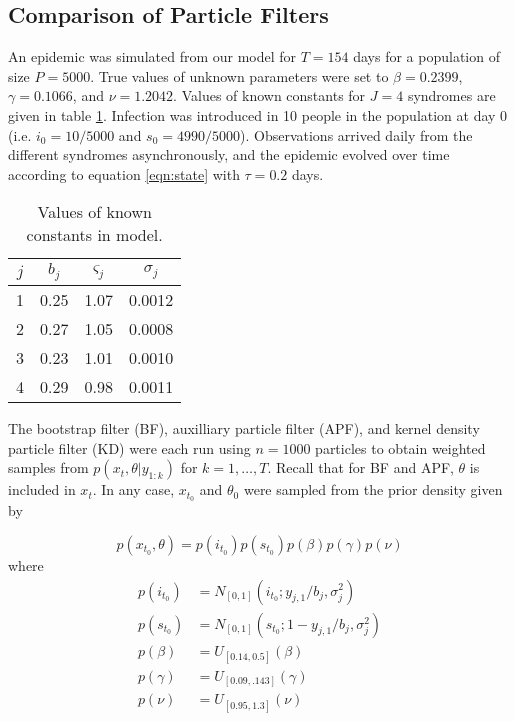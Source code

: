 \documentclass{article}
\begin{document}
\subsection{Comparison of Particle Filters}

An epidemic was simulated from our model for $T = 154$ days for a population of size $P = 5000$.  True values of unknown parameters were set to $\beta = 0.2399$, $\gamma = 0.1066$, and $\nu = 1.2042$.  Values of known constants for $J = 4$ syndromes are given in table \ref{tab:true}.  Infection was introduced in 10 people in the population at day 0 (i.e. $i_0 = 10/5000$ and $s_0 = 4990/5000$).  Observations arrived daily from the different syndromes asynchronously, and the epidemic evolved over time according to equation \eqref{eqn:state} with $\tau = 0.2$ days.

\begin{table}[ht]
\begin{center}
\caption{Values of known constants in model.}
\label{tab:true}
\begin{tabular}{|cccc|}
\hline
$j$ & $b_j$ & $\varsigma_j$ & $\sigma_j$ \\
\hline
1 & 0.25 & 1.07 & 0.0012 \\
2 & 0.27 & 1.05 & 0.0008 \\
3 & 0.23 & 1.01 & 0.0010 \\
4 & 0.29 & 0.98 & 0.0011 \\
\hline
\end{tabular}
\end{center}
\end{table}

The bootstrap filter (BF), auxilliary particle filter (APF), and kernel density particle filter (KD) were each run using $n = 1000$ particles to obtain weighted samples from $p(x_t,\theta|y_{1:k})$ for $k = 1,\ldots,T$.  Recall that for BF and APF, $\theta$ is included in $x_t$.  In any case, $x_{t_0}$ and $\theta_{0}$ were sampled from the prior density given by

\[p(x_{t_0},\theta) = p(i_{t_0})p(s_{t_0})p(\beta)p(\gamma)p(\nu)\] where
\begin{align*}
p(i_{t_0}) &= N_{[0,1]}(i_{t_0};y_{j,1}/b_j,\sigma^2_j) \\
p(s_{t_0}) &= N_{[0,1]}(s_{t_0};1 - y_{j,1}/b_j,\sigma^2_j) \\
p(\beta) &= U_{[0.14,0.5]}(\beta) \\
p(\gamma) &= U_{[0.09,.143]}(\gamma) \\
p(\nu) &= U_{[0.95,1.3]}(\nu)
\end{align*}
\end{document}
